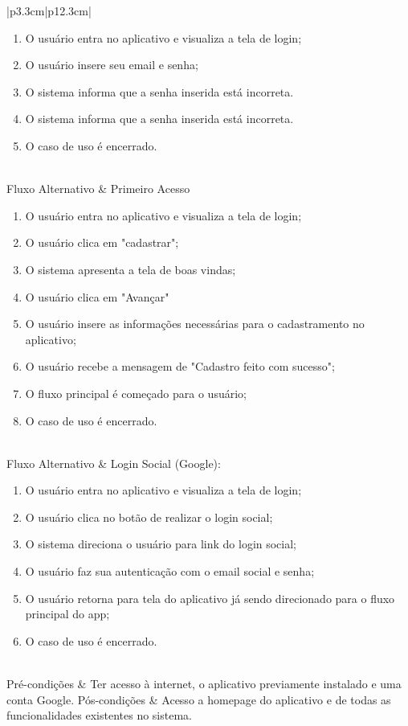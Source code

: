\begin{apendicesenv}
\begin{longtable}{|p{3.3cm}|p{12.3cm}|}
\begin{enumerate}
		\item O usuário entra no aplicativo e visualiza a tela de login;
		\item O usuário insere seu email e senha;
		\item O sistema informa que a senha inserida está incorreta.
		\item O sistema informa que a senha inserida está incorreta.
		\item O caso de uso é encerrado. 
	\end{enumerate}\\
	\hline
	Fluxo Alternativo & Primeiro Acesso
	\begin{enumerate}
		\item O usuário entra no aplicativo e visualiza a tela de login;
		\item O usuário clica em "cadastrar";
		\item O sistema apresenta a tela de boas vindas;
		\item O usuário clica em "Avançar"
		\item O usuário insere as informações necessárias para o cadastramento no aplicativo;
		\item O usuário recebe a mensagem de "Cadastro feito com sucesso";
		\item O fluxo principal é começado para o usuário;
		\item O caso de uso é encerrado.
	\end{enumerate} \\
	\hline
	Fluxo Alternativo & Login Social (Google):
	\begin{enumerate}
		\item O usuário entra no aplicativo e visualiza a tela de login;
		\item O usuário clica no botão de realizar o login social;
		\item O sistema direciona o usuário para link do login social;
		\item O usuário faz sua autenticação com o email social e senha;
		\item O usuário retorna para tela do aplicativo já sendo direcionado para o fluxo principal do app;
		\item O caso de uso é encerrado. 
	\end{enumerate} \\
	\hline
	Pré-condições & Ter acesso à internet, o aplicativo previamente instalado e uma conta Google.
	\hline
	Pós-condições & Acesso a homepage do aplicativo e de todas as funcionalidades existentes no sistema. \\
	\hline
\end{longtable}



\end{apendicesenv}
